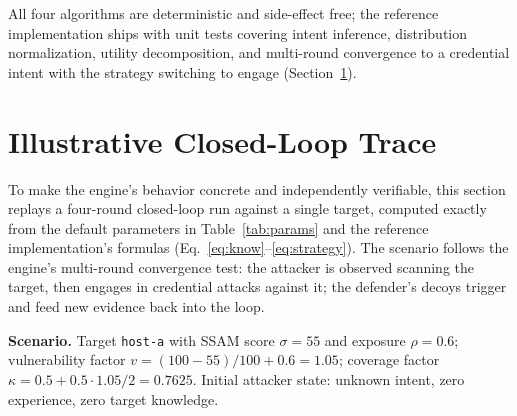\documentclass[preprints,article,accept,oneauthor]{Definitions/mdpi}
\newcommand{\act}[1]{\texttt{#1}}
\begin{document}
All four algorithms are deterministic and side-effect free; the reference
implementation ships with unit tests covering intent inference, distribution
normalization, utility decomposition, and multi-round convergence to a
credential intent with the strategy switching to engage
(Section~\ref{sec:trace}).

\section{Illustrative Closed-Loop Trace}
\label{sec:trace}

To make the engine's behavior concrete and independently verifiable, this
section replays a four-round closed-loop run against a single target,
computed exactly from the default parameters in Table~\ref{tab:params} and
the reference implementation's formulas
(Eq.~\ref{eq:know}--\ref{eq:strategy}). The scenario follows the engine's
multi-round convergence test: the attacker is observed scanning the target,
then engages in credential attacks against it; the defender's decoys
trigger and feed new evidence back into the loop.

\textbf{Scenario.} Target \act{host-a} with SSAM score $\sigma = 55$ and
exposure $\rho = 0.6$; vulnerability factor $v = (100-55)/100 + 0.6 = 1.05$;
coverage factor $\kappa = 0.5 + 0.5 \cdot 1.05/2 = 0.7625$. Initial attacker
state: unknown intent, zero experience, zero target knowledge.
\end{document}
